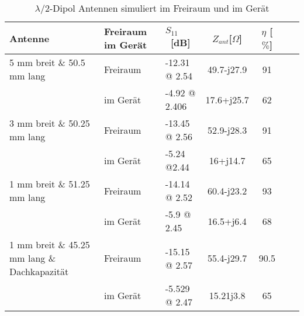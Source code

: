 \begin{table}[!ht]
  \centering
  \begin{tabular}{p{8cm} p{2cm} l c c c r} 
  \toprule 
  Antenne                  	& Freiraum im Gerät	 & $S_{11}$ \ [dB]	& $Z_{ant}$[$\Omega$] 	& $\eta$ [$\%$]\\ 
  \midrule
 5 mm breit \& 50.5 mm lang    	& Freiraum			&	-12.31 @ 2.54		&  	49.7-j27.9		&   	91	\\
            					& im Gerät   			&   -4.92 @ 2.406   		&	17.6+j25.7		& 	62	\\
 3 mm breit \& 50.25 mm lang    & Freiraum			&    -13.45 @ 2.56  		&	52.9-j28.3		&	91	\\
     						& im Gerät				&  	-5.24 @2.44			&	16+j14.7			&	65	\\
 1 mm breit \& 51.25 mm lang  	& Freiraum			&    -14.14 @ 2.52    	&	60.4-j23.2		&	93	\\
      						& im Gerät			&  	-5.9 @ 2.45			&	16.5+j6.4		&	68	\\
  1 mm breit \& 45.25 mm lang
  \& Dachkapazität  		& Freiraum				&   -15.15 @ 2.57      	&	55.4-j29.7		&	90.5	\\
      						& im Gerät			&  	-5.529 @ 2.47		&	15.21j3.8		&	65	\\
 \bottomrule
  \end{tabular}
  \caption{$\lambda/2$-Dipol Antennen simuliert im Freiraum und im Gerät}
  \label{tab:Vergeich_Lambda/2_Freiraum_Geraet}
\end{table}
%	

%	

%	

